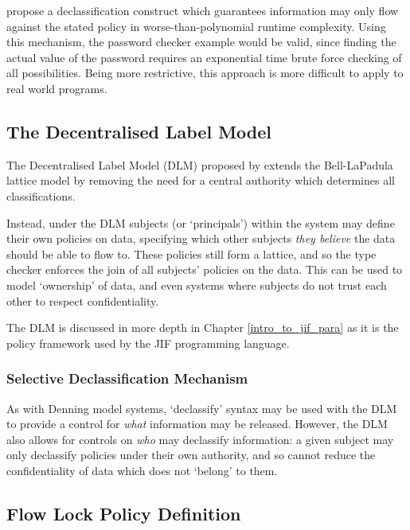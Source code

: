 \citeauthor{volpano2000declassification} \cite{volpano2000declassification} propose a declassification construct which guarantees information may only flow against the stated policy in worse-than-polynomial runtime complexity. Using this mechanism, the password checker example would be valid, since finding the actual value of the password requires an exponential time brute force checking of all possibilities. Being more restrictive, this approach is more difficult to apply to real world programs.

\subsection{The Decentralised Label Model} \label{theory_if_dlm}

The Decentralised Label Model (DLM) proposed by \citeauthor{myers1997if} \cite{myers1997if} extends the Bell-LaPadula lattice model by removing the need for a central authority which determines all classifications.

Instead, under the DLM subjects (or `principals') within the system may define their own policies on data, specifying which other subjects \textit{they believe} the data should be able to flow to. These policies still form a lattice, and so the type checker enforces the join of all subjects' policies on the data. This can be used to model `ownership' of data, and even systems where subjects do not trust each other to respect confidentiality.

The DLM is discussed in more depth in Chapter \ref{intro_to_jif_para} as it is the policy framework used by the JIF programming language.

\subsubsection{Selective Declassification Mechanism}

As with Denning model systems, `declassify' syntax may be used with the DLM to provide a control for \textit{what} information may be released. However, the DLM also allows for controls on \textit{who} may declassify information: a given subject may only declassify policies under their own authority, and so cannot reduce the confidentiality of data which does not `belong' to them.

\subsection{Flow Lock Policy Definition}

